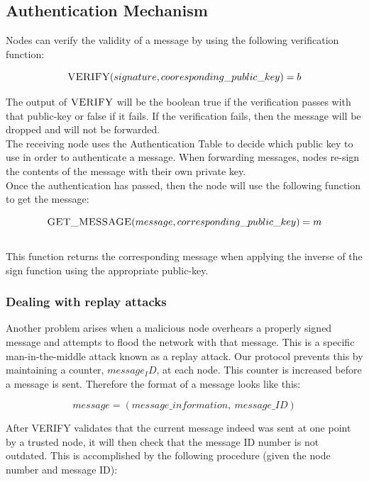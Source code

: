 \documentclass[letterpaper]{article}
\begin{document}
\subsection{Authentication Mechanism}
Nodes can verify the validity of a message by using the following verification function:

$$\textsc{VERIFY}(signature, cooresponding\_public\_key) =  b $$

The output of $\textsc{VERIFY}$ will be the boolean true if the verification passes with that public-key or false if it fails. If the verification fails, then the message will be dropped and will not be forwarded. 
\\
The receiving node uses the Authentication Table to decide which public key to use in order to authenticate a message. When forwarding messages, nodes re-sign the contents of the message with their own private key.
\\

Once the authentication has passed, then the node will use the following function to get the message:

$$\textsc{GET\_MESSAGE}(message, corresponding\_public\_key) = m$$
\\

This function returns the corresponding message when applying the inverse of the sign function using the appropriate public-key.

\subsubsection{Dealing with replay attacks}

Another problem arises when a malicious node overhears a properly signed message and attempts to flood the network  with that message. This is a specific man-in-the-middle attack known as a replay attack. Our protocol prevents this by maintaining a counter, $message_ID$, at each node. This counter is increased before a message is sent. Therefore the format of a message looks like this:

$$message = (message\_information, \ message\_ID)$$

After \textsc{VERIFY} validates that the current message indeed was sent at one point by a trusted node, it will then check that the message ID number
is not outdated. This is accomplished by the following procedure (given the node number and message ID):
\\
\end{document}
